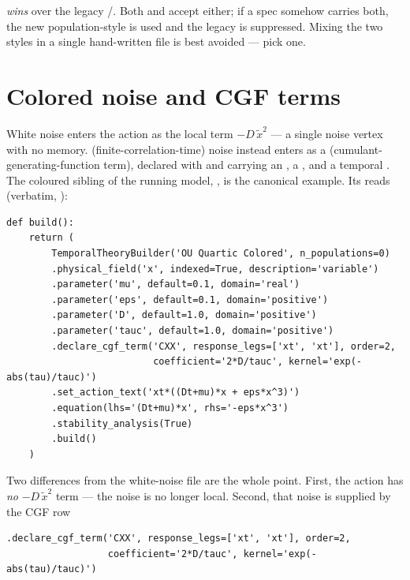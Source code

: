 \begin{gotcha}
 \emph{wins} over the legacy /. Both
 and  accept either; if a spec
somehow carries both, the new population-style  is used and the
legacy  is suppressed. Mixing the two styles in a single
hand-written file is best avoided --- pick one.
\end{gotcha}

\section{Colored noise and CGF terms}\label{sec:tf-colored}

White noise enters the action as the local term $-D\,\tilde x^{2}$ --- a single
noise vertex with no memory.  (finite-correlation-time) noise
instead enters as a  (cumulant-generating-function term), declared
with  and carrying an , a
, and a temporal . The coloured sibling of the
running model, , is the canonical
example. Its  reads (verbatim, ):

\begin{lstlisting}
def build():
    return (
        TemporalTheoryBuilder('OU Quartic Colored', n_populations=0)
        .physical_field('x', indexed=True, description='variable')
        .parameter('mu', default=0.1, domain='real')
        .parameter('eps', default=0.1, domain='positive')
        .parameter('D', default=1.0, domain='positive')
        .parameter('tauc', default=1.0, domain='positive')
        .declare_cgf_term('CXX', response_legs=['xt', 'xt'], order=2,
                          coefficient='2*D/tauc', kernel='exp(-abs(tau)/tauc)')
        .set_action_text('xt*((Dt+mu)*x + eps*x^3)')
        .equation(lhs='(Dt+mu)*x', rhs='-eps*x^3')
        .stability_analysis(True)
        .build()
    )
\end{lstlisting}

Two differences from the white-noise file are the whole point. First, the action
 has \emph{no} $-D\,\tilde x^{2}$ term --- the
noise is no longer local. Second, that noise is supplied by the CGF row

\begin{lstlisting}
.declare_cgf_term('CXX', response_legs=['xt', 'xt'], order=2,
                  coefficient='2*D/tauc', kernel='exp(-abs(tau)/tauc)')
\end{lstlisting}

